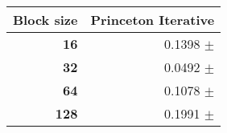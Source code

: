 \begin{tabular}{rr}\toprule
\textbf{Block size}  & \textbf{Princeton Iterative}\\\midrule
\textbf{16}  & 0.1398 $\pm$ \\
\textbf{32}  & 0.0492 $\pm$ \\
\textbf{64}  & 0.1078 $\pm$ \\
\textbf{128} & 0.1991 $\pm$ \\
\bottomrule
\end{tabular}
